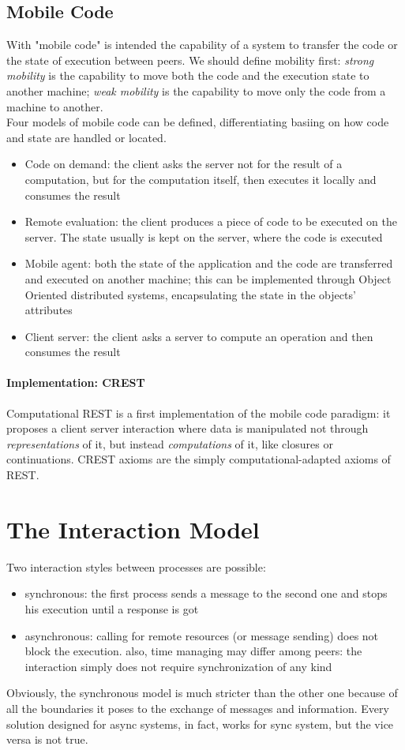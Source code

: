 \documentclass[10pt,a4paper]{article}
\begin{document}
			\subsection{Mobile Code}
				With "mobile code" is intended the capability of a system to transfer the code or the state of execution between peers. We should define mobility first: \emph{strong mobility} is the capability to move both the code and the execution state to another machine; \emph{weak mobility} is the capability to move only the code from a machine to another.\\
				Four models of mobile code can be defined, differentiating basiing on how code and state are handled or located.
				\begin{itemize}
					\item Code on demand: the client asks the server not for the result of a computation, but for the computation itself, then executes it locally and consumes the result
					\item Remote evaluation: the client produces a piece of code to be executed on the server. The state usually is kept on the server, where the code is executed
					\item Mobile agent: both the state of the application and the code are transferred and executed on another machine; this can be implemented through Object Oriented distributed systems, encapsulating the state in the objects' attributes 
					\item Client server: the client asks a server to compute an operation and then consumes the result
				\end{itemize}
				
				\paragraph{Implementation: CREST}
					Computational REST is a first implementation of the mobile code paradigm: it proposes a client server interaction where data is manipulated not through \emph{representations} of it, but instead \emph{computations} of it, like closures or continuations. CREST axioms are the simply computational-adapted axioms of REST. 
				
		\section{The Interaction Model}
			Two interaction styles between processes are possible:
			\begin{itemize}
				\item synchronous: the first process sends a message to the second one and stops his execution until a response is got
				\item asynchronous: calling for remote resources (or message sending) does not block the execution. also, time managing may differ among peers: the interaction simply does not require synchronization of any kind
			\end{itemize}
			Obviously, the synchronous model is much stricter than the other one because of all the boundaries it poses to the exchange of messages and information. Every solution designed for async systems, in fact, works for sync system, but the vice versa is not true. 
			
\end{document}

